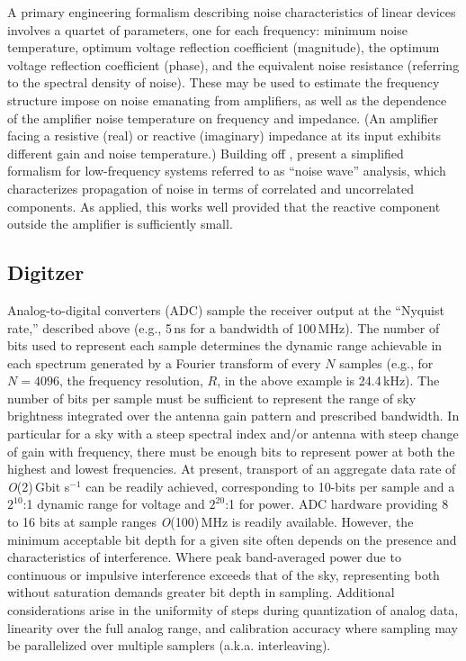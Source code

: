 A primary engineering formalism describing noise characteristics of linear devices involves a quartet of parameters, one for each frequency:  minimum noise temperature, optimum voltage reflection coefficient (magnitude), the optimum voltage reflection coefficient (phase), and the equivalent noise resistance (referring to the spectral density of noise).  These may be used to estimate the frequency structure impose on noise emanating from amplifiers, as well as the dependence of the amplifier noise temperature on frequency and impedance.  (An amplifier facing a resistive (real) or reactive (imaginary) impedance at its input exhibits different gain and noise temperature.)  Building off \cite{hu04}, \cite{rogers12}  present a simplified formalism for low-frequency systems referred to as ``noise wave'' analysis, which characterizes propagation of noise in terms of correlated and uncorrelated components.  As applied, this works well provided that the reactive component outside the amplifier is sufficiently small. 

\subsection{Digitzer}
  
Analog-to-digital converters (ADC) sample the receiver output at the ``Nyquist rate,'' described above (e.g., 5\,ns for a bandwidth of 100\,MHz).  The number of bits used to represent each sample determines the dynamic range achievable in each spectrum generated by a Fourier transform of every $N$ samples (e.g., for $N=4096$, the frequency resolution, $R$, in the above example is 24.4\,kHz).   The number of bits per sample must be sufficient to represent the range of sky brightness integrated over the antenna gain pattern and prescribed bandwidth. In particular for a sky with a steep spectral index and/or antenna with steep change of gain with frequency, there must be enough bits to represent power at both the highest and lowest frequencies.  At present, transport of an aggregate data rate of {\it O}(2)\,Gbit s$^{-1}$ can be readily achieved, corresponding to 10-bits per sample and a $2^{10}$:1 dynamic range for voltage and $2^{20}$:1 for power.
ADC hardware providing 8 to 16 bits at sample ranges {\it O}(100)\,MHz is readily available.  However, the minimum acceptable bit depth for a given site often depends on the presence and characteristics of interference.  Where peak band-averaged power due to continuous or impulsive interference exceeds that of the sky, representing both without saturation demands greater bit depth in sampling.  Additional considerations arise in  the uniformity of steps during quantization of analog data, linearity over the full analog range, and calibration accuracy where sampling may be parallelized over multiple samplers (a.k.a. interleaving).
 
